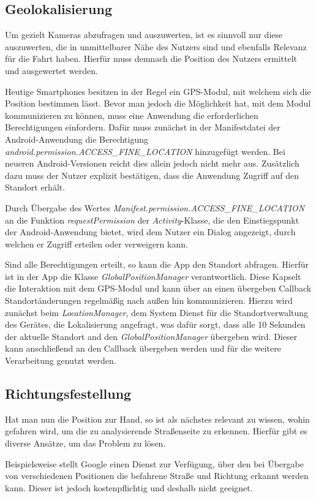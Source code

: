 \subsection{Geolokalisierung}
Um gezielt Kameras abzufragen und auszuwerten, ist es sinnvoll nur diese auszuwerten, die in unmittelbarer Nähe des Nutzers sind und ebenfalls Relevanz für die Fahrt haben. Hierfür muss demnach die Position des Nutzers ermittelt und ausgewertet werden.

Heutige Smartphones besitzen in der Regel ein GPS-Modul, mit welchem sich die Position bestimmen lässt.
Bevor man jedoch die Möglichkeit hat, mit dem Modul kommunizieren zu können, muss eine Anwendung die erforderlichen Berechtigungen einfordern.
Dafür muss zunächst in der Manifestdatei der Android-Anwendung die Berechtigung {\em android.permission.ACCESS\_FINE\_LOCATION} hinzugefügt werden.
Bei neueren Android-Versionen reicht dies allein jedoch nicht mehr aus. Zusätzlich dazu muss der Nutzer explizit bestätigen, dass die Anwendung Zugriff auf den Standort erhält.

Durch Übergabe des Wertes {\em Manifest.permission.ACCESS\_FINE\_LOCATION} an die Funktion {\em requestPermission} der {\em Activity}-Klasse, die den Einstiegspunkt der Android-Anwendung bietet, wird dem Nutzer ein Dialog angezeigt, durch welchen er Zugriff erteilen oder verweigern kann.


Sind alle Berechtigungen erteilt, so kann die App den Standort abfragen.
Hierfür ist in der App die Klasse {\em GlobalPositionManager} verantwortlich. Diese Kapselt die Interaktion mit dem GPS-Modul und kann über an einen übergeben Callback Standortänderungen regelmäßig nach außen hin kommunizieren.
Hierzu wird zunächst beim {\em LocationManager}, dem System Dienst für die Standortverwaltung des Gerätes, die Lokalisierung angefragt, was dafür sorgt, dass alle 10 Sekunden der aktuelle Standort and den {\em GlobalPositionManager} übergeben wird. Dieser kann anschließend an den Callback übergeben werden und für die weitere Verarbeitung genutzt werden.

\subsection{Richtungsfestellung}
Hat man nun die Position zur Hand, so ist als nächstes relevant zu wissen, wohin gefahren wird, um die zu analysierende Straßenseite zu erkennen.
Hierfür gibt es diverse Ansätze, um das Problem zu lösen.

Beispielsweise stellt Google einen Dienst zur Verfügung, über den bei Übergabe von verschiedenen Positionen die befahrene Straße und Richtung erkannt werden kann. Dieser ist jedoch kostenpflichtig und deshalb nicht geeignet.

